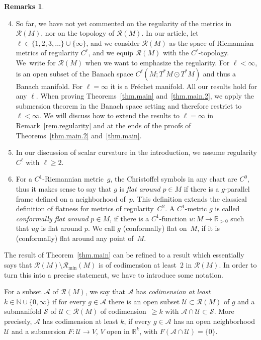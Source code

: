 \documentclass[11pt]{article}
\numberwithin{equation}{section}
\newcommand\<{\langle}
\renewcommand\>{\rangle}
\newcommand{\NN}{\mathbb N}
\newcommand{\RR}{\mathbb R}
\newcommand{\maA}{\mathcal A}
\newcommand{\maR}{\mathcal R}
\newcommand{\maS}{\mathcal S}
\newcommand{\maU}{\mathcal U}
\theoremstyle{definition}
\newtheorem{Remarks}[Theorem]{Remarks}
\let\define\emph
\newcommand\={\,=\,}
\newcommand\Rmin{\maR_{\mathrm{min}}}
\numberwithin{equation}{section}
\begin{document}
\begin{Remarks}\quad\begin{enumerate}[(1)]\setcounter{enumi}{3}
\item So far, we have not yet commented on the regularity of the metrics in $\maR(M)$, nor on the topology of $\maR(M)$.
In our article, let $\ell\in \{1,2,3,\ldots\}\cup\{\infty\}$, and we consider $\maR(M)$ as the space of Riemannian metrics of regularity $C^\ell$, and we equip $\maR(M)$ with the $C^\ell$-topology.
We~write \smash{$\maR^{C^\ell}(M)$} for $\maR(M)$ when we want to emphasize the regularity.
For $\ell<\infty$, \smash{$\maR^{C^\ell}(M)$} is an open subset of the Banach space $C^\ell(M;T^*M\odot T^*M)$ and thus a Banach manifold. For $\ell=\infty$ it is a Fr\'echet manifold.
All our results hold for any $\ell$.
When proving Theorems~\ref{thm.main} and~\ref{thm.main.2}, we apply the submersion theorem in the Banach space setting and therefore restrict to $\ell<\infty$. We will discuss how to extend the results to $\ell=\infty$ in Remark~\ref{rem.regularity} and at the ends of the proofs of Theorems~\ref{thm.main.2} and~\ref{thm.main}.
\item In our discussion of scalar curvature in the introduction, we assume regularity $C^\ell$ with $\ell\geq 2$.
\item For a $C^1$-Riemannian metric~$g$, the Christoffel symbols in any chart are $C^0$, thus it makes sense to say that $g$ is \define{flat around} $p\in M$ if there is a $g$-parallel frame defined on a neighborhood of~$p$. This definition extends the classical definition of flatness for metrics of regularity~$C^2$.
A $C^1$-metric $g$ is called \define{conformally flat around} $p\in M$, if there is a $C^1$-function $u\colon M\to \RR_{>0}$ such that $ug$ is flat around $p$. We call $g$ (conformally) flat on~$M$, if it is (conformally) flat around any point of~$M$.
\end{enumerate}
\end{Remarks}


The result of Theorem~\ref{thm.main} can be refined to a result which essentially says that $\maR(M)\setminus\Rmin(M)$ is of codimension at least~$2$ in $\maR(M)$. In order to turn this into a precise statement, we have to introduce some notation.

For a subset $\maA$ of $\maR(M)$, we say that $\maA$ has
\define{codimension at least $k\in \NN\cup\{0,\infty\}$}
if for every $g\in \maA$ there is an open subset $\maU\subset\maR(M)$ of $g$ and a submanifold $\maS$ of $\maU\subset \maR(M)$ of codimension~$\geq k$ with $\maA\cap \maU\subset \maS$.
More precisely, $\maA$ has
codimension at least $k$, if every $g\in \maA$ has an open neighborhood $\maU$ and a submersion $F\colon\maU\to V$, $V$ open in $\RR^k$, with $F(\mathcal{A}\cap\mathcal{U})=\{0\}$.
\end{document}
